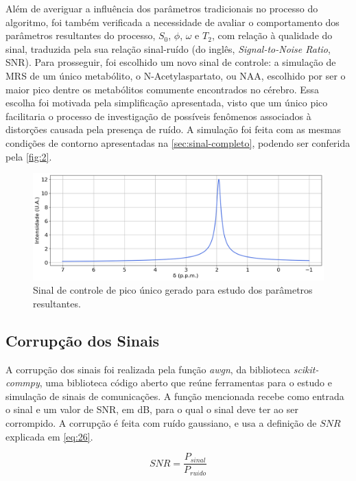 \documentclass[12pt]{article}
\begin{document}
Além de averiguar a influência dos parâmetros tradicionais no processo do algoritmo, foi também verificada a necessidade de avaliar o 
comportamento dos parâmetros resultantes do processo, $S_0$, $\phi$, $\omega$ e $T_2$, com relação à qualidade do sinal, traduzida pela
sua relação sinal-ruído (do inglês, \textit{Signal-to-Noise Ratio}, SNR). Para prosseguir, foi escolhido um novo sinal de controle: a 
simulação de MRS de um único metabólito, o N-Acetylaspartato, ou NAA, escolhido por ser o maior pico dentre os metabólitos comumente 
encontrados no cérebro. Essa escolha foi motivada pela simplificação apresentada, visto que um único pico facilitaria o processo de 
investigação de possíveis fenômenos associados à distorções causada pela presença de ruído. A simulação foi feita com as mesmas 
condições de contorno apresentadas na \autoref{sec:sinal-completo}, podendo ser conferida pela \autoref{fig:2}.

\begin{figure} [H]
    \includegraphics[scale=0.5]{sinal-unico-pico.png}
    \centering
    \caption{Sinal de controle de pico único gerado para estudo dos parâmetros resultantes.}
    \label{fig:2}
\end{figure}

\subsection{Corrupção dos Sinais}

A corrupção dos sinais foi realizada pela função \textit{awgn}, da biblioteca \textit{scikit-commpy}, uma biblioteca código aberto que 
reúne ferramentas para o estudo e simulação de sinais de comunicações. A função mencionada recebe como entrada o sinal e um valor de SNR, 
em dB, para o qual o sinal deve ter ao ser corrompido. A corrupção é feita com ruído gaussiano, e usa a definição de $SNR$ explicada em 
\autoref{eq:26}.

\begin{equation} \label{eq:26}
    SNR = \frac{P_{sinal}}{P_{ruido}}
\end{equation}
\end{document}
